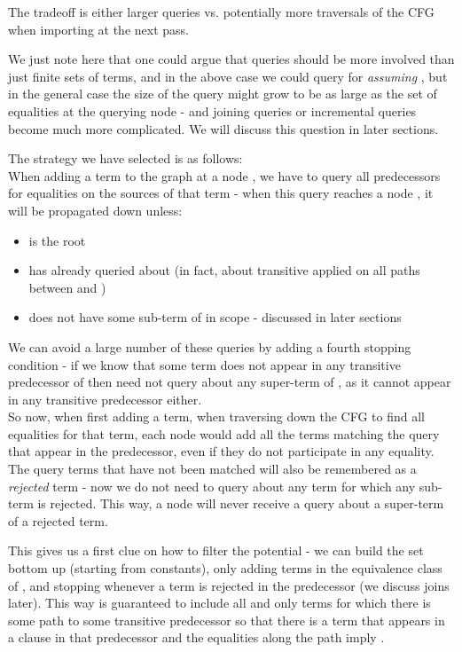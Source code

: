 The tradeoff is either larger queries vs. potentially more traversals of the CFG when importing at the next pass.

We just note here that one could argue that queries should be more involved than just finite sets of terms, and in the above case we could query for  \emph{assuming} , but in the general case the size of the query might grow to be as large as the set of equalities at the querying node - and joining queries or incremental queries become much more complicated. We will discuss this question in later sections. 

The strategy we have selected is as follows:\\
When adding a term  to the graph at a node , we have to query all predecessors for equalities on the sources  of that term - when this query reaches a node , it will be propagated down unless:
\begin{itemize}
	\item {} is the root
	\item {} has already queried about  (in fact, about transitive  applied on all paths between  and )
	\item {} does not have some sub-term of  in scope - discussed in later sections
\end{itemize}

We can avoid a large number of these queries by adding a fourth stopping condition - if we know that some term  does not appear in any transitive predecessor of  then  need not query about any super-term of , as it cannot appear in any transitive predecessor either.\\
So now, when first adding a term, when traversing down the CFG to find all equalities for that term, each node would add all the terms matching the query that appear in the predecessor, even if they do not participate in any equality. The query terms that have not been matched will also be remembered as a \emph{rejected} term - 
now we do not need to query about any term for which any sub-term is rejected.
This way, a node will never receive a query about a super-term of a rejected term.

This gives us a first clue on how to filter the potential  - we can build the set bottom up (starting from constants), only adding terms in the equivalence class of , and stopping whenever a term is rejected in the predecessor (we discuss joins later).
This way  is guaranteed to include all and only terms  for which there is some path to some transitive predecessor so that there is a term  that appears in a clause in that predecessor and the equalities along the path imply .

